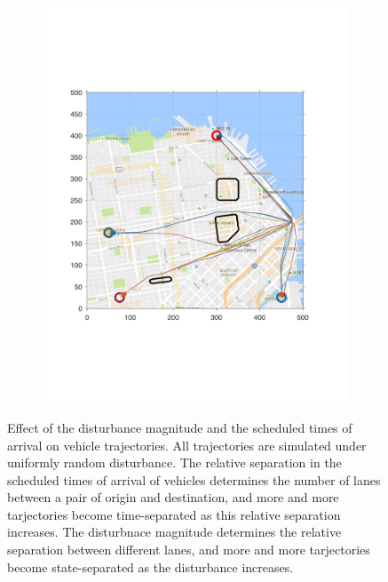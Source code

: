 \begin{figure}[!htb]
\begin{subfigure}{0.5\columnwidth}
  \includegraphics[width=\columnwidth]{figs/sf_d11sep5}
  \label{fig:sf_d11sep5}
\end{subfigure}%
\caption{Effect of the disturbance magnitude and the scheduled times of arrival on vehicle trajectories. All trajectories are simulated under uniformly random disturbance. The relative separation in the scheduled times of arrival of vehicles determines the number of lanes between a pair of origin and destination, and more and more tarjectories become time-separated as this relative separation increases. The disturbnace magnitude determines the relative separation between different lanes, and more and more tarjectories become state-separated as the disturbance increases. }
\label{fig:trajectories_sf}
\end{figure}

